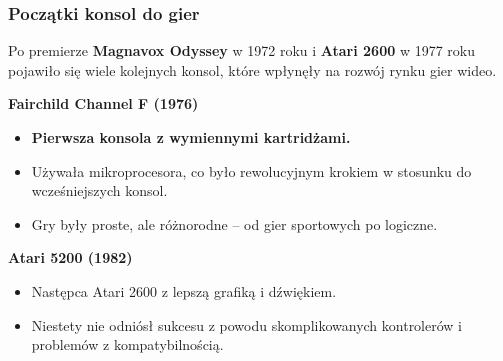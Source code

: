 \documentclass[8pt]{beamer}
\begin{document}
\begin{frame}
\frametitle{Początki konsol do gier}
Po premierze \textbf {Magnavox Odyssey} w 1972 roku i \textbf {Atari 2600} w 1977 roku pojawiło się wiele kolejnych konsol, które wpłynęły na rozwój rynku gier wideo.

\textbf {Fairchild Channel F (1976) }
\begin{itemize}
\item \textbf {Pierwsza konsola z wymiennymi kartridżami.}
\item Używała mikroprocesora, co było rewolucyjnym krokiem w stosunku do wcześniejszych konsol.
\item Gry były proste, ale różnorodne – od gier sportowych po logiczne.

\end{itemize}

\textbf {Atari 5200 (1982)}
\begin{itemize}
\item Następca Atari 2600 z lepszą grafiką i dźwiękiem.
\item Niestety nie odniósł sukcesu z powodu skomplikowanych kontrolerów i problemów z kompatybilnością.

\end{itemize}

\end{frame}
\end{document}
